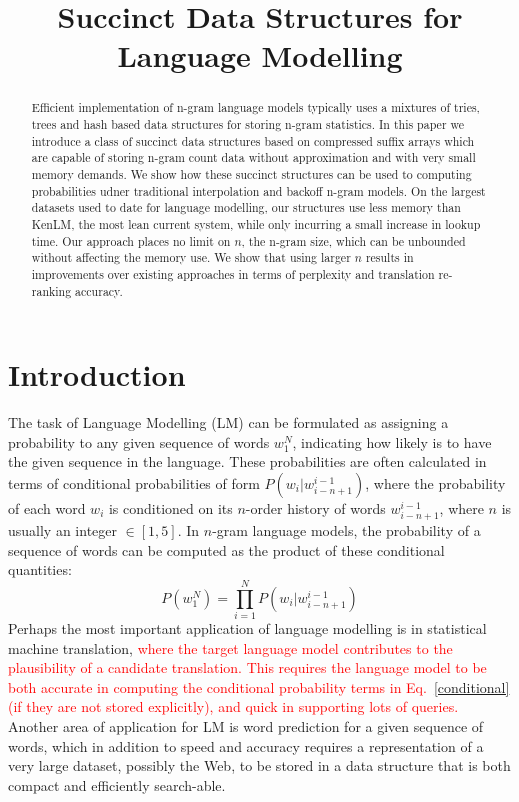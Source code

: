 \documentclass[11pt]{article}
\title{Succinct Data Structures for Language Modelling}
\author{}
\date{}
\newcommand{\reza}[1]{\textcolor{red}{#1}}
\begin{document}
\maketitle
\begin{abstract} \footnotesize
Efficient implementation of n-gram language models typically uses a mixtures of tries, trees and hash based data structures for storing n-gram statistics. 
In this paper we introduce a class of succinct data structures based on compressed suffix arrays which are capable of storing n-gram count data without approximation and with very small memory demands. 
We show how these succinct structures can be used to computing probabilities udner traditional interpolation and backoff n-gram models. 
On the largest datasets used to date for language modelling, our structures use less memory than KenLM, the most lean current system, while only incurring a small increase in lookup time. 
Our approach places no limit on $n$, the n-gram size, which can be unbounded without affecting the memory use. 
We show that using larger $n$ results in improvements over existing approaches in terms of perplexity and translation re-ranking accuracy.
\end{abstract}

\section{Introduction}
The task of Language Modelling (LM) can be formulated as assigning a probability to any given sequence of words $w_{1}^{N}$, indicating how likely is to have the given sequence in the language. These probabilities are often calculated in terms of conditional probabilities of form $P(w_i|w_{i-n+1}^{i-1})$, where the probability of each word $w_i$ is conditioned on its $n$-order history of words $w_{i-n+1}^{i-1}$, where $n$ is usually an integer $\in[1,5]$. In $n$-gram language models, the probability of a sequence of words can be computed as the product of these conditional quantities:
\begin{equation}\label{conditional}
 P(w_{1}^{N})= \prod_{i=1}^{N} P(w_i|w_{i-n+1}^{i-1})
\end{equation} 
Perhaps the most important application of language modelling is in statistical machine translation, \reza{where the target language model contributes to the plausibility of a candidate translation. 
%
This requires the language model to be both accurate in computing the  conditional probability terms in Eq.~\ref{conditional} (if they are not stored explicitly), and quick in supporting lots of queries. }
%
Another area of application for LM is word prediction for a given sequence of words, which in addition to speed and accuracy requires a representation of a very large dataset, possibly the Web, to be stored in a data structure that is both compact and efficiently search-able.
\end{document}
